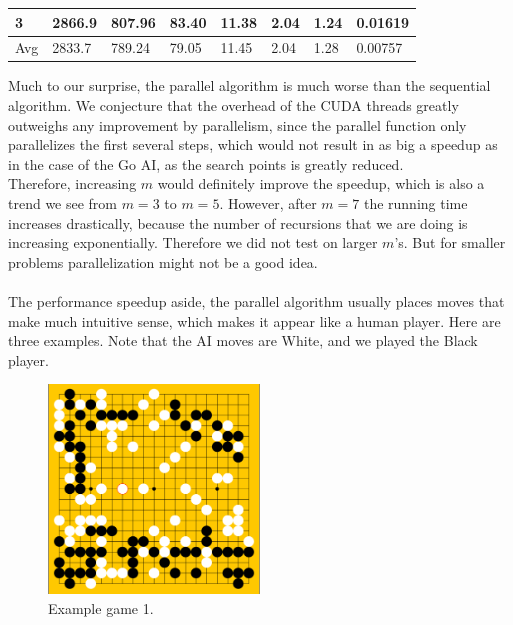 \documentclass[11pt]{article}
\begin{document}
\begin{table}[H]
\begin{tabular}{|l|l|l|l|l|l|l|l|}
3                          & 2866.9                            & 807.96                            & 83.40                            & 11.38                             & 2.04                              & 1.24                             & 0.01619                                                                        \\ \hline
Avg                        & 2833.7                            & 789.24                            & 79.05                            & 11.45                             & 2.04                              & 1.28                             & 0.00757                                                                        \\ \hline
\end{tabular}
\end{table}
Much to our surprise, the parallel algorithm is much worse than the sequential algorithm. We conjecture that the overhead of the CUDA threads greatly outweighs any improvement by parallelism, since the parallel function only parallelizes the first several steps, which would not result in as big a speedup as in the case of the Go AI, as the search points is greatly reduced.\\
Therefore, increasing $m$ would definitely improve the speedup, which is also a trend we see from $m = 3$ to $m = 5$. However, after $m = 7$ the running time increases drastically, because the number of recursions that we are doing is increasing exponentially. Therefore we did not test on larger $m$'s. But for smaller problems parallelization might not be a good idea.\\
\\
The performance speedup aside, the parallel algorithm usually places moves that make much intuitive sense, which makes it appear like a human player. Here are three examples. Note that the AI moves are White, and we played the Black player.
\begin{figure}[H]
    \centering
    \includegraphics[width=0.5\textwidth]{game_1.png}
    \caption{Example game 1.}
\end{figure}
\end{document}
